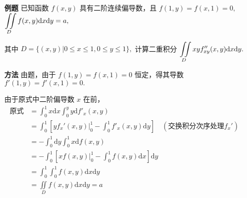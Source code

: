 \begin{itemize}
    \item[\textbf{例题}] 已知函数 $ f(x,y) $ 具有二阶连续偏导数，且 $ f(1,y) = f (x,1) = 0,$
    $ \displaystyle \iint\limits_{D}f(x,y)\mathrm{d}x\mathrm{d}y = a, $ 

    其中 $ D = \{(x,y)|0\leq x\leq 1, 0\leq y \leq 1\}, $ 
    计算二重积分
    $ \displaystyle \iint\limits_{D}xyf^{\prime\prime}_{xy}(x,y)\mathrm{d}x\mathrm{d}y. $ 
    \item[\textbf{方法}] 
    由题，由于 $ f(1,y) = f (x,1) = 0 $ 恒定，得其导数 $ f'(1,y) = f'(x,1) = 0.$

    由于原式中二阶偏导数 $ x $ 在前，
    \begin{equation*}
        \begin{aligned}
            \textrm{原式}&= \int_0^1 x\mathrm{d}x\int_0^y y\mathrm{d}f'_x(x,y) \\ 
            &= \int_0^1 \left[yf_x'(x,y)\Big|_0^1 - \int_0^1f'_x(x,y)\mathrm{d}y\right] 
            \quad{}(\textrm{交换积分次序处理}f_x') \\ 
            &= -\int_0^1\mathrm{d}y\int_0^1 x\mathrm{d}f(x,y)\\ &= 
            -\int_0^1\left[xf(x,y)\Big|_0^1 - \int_0^1f(x,y)\mathrm{d}x\right]\mathrm{d}y \\&= 
            \int_0^1\int_0^1f(x,y)\mathrm{d}x\mathrm{d}y \\&= 
            \iint\limits_{D}f(x,y)\mathrm{d}x\mathrm{d}y = a
        \end{aligned}
    \end{equation*}
\end{itemize}

